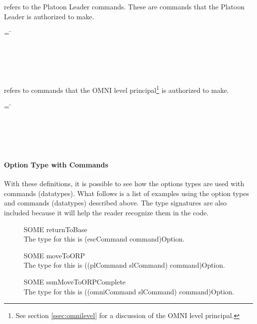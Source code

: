 \documentclass[../../main/main.tex]{subfiles}
\begin{document}
 refers to the Platoon Leader commands.  These are commands that the Platoon Leader is authorized to make.  

\begin{tabbing}
 = \=  \\
					     \>\HOLTokenBar{}  \\
					     \>\HOLTokenBar{}  \\
					     \>\HOLTokenBar{} \\
         				     \> \HOLTokenBar{}  \\
				             \> \HOLTokenBar{} 
\end{tabbing}


 refers to commands that the OMNI level principal\footnote{See section \ref{ssec:omnilevel} for a discussion of the OMNI level principal.} is authorized to make. 

\begin{tabbing}
 = \=  \\
						 \> \HOLTokenBar{} \\
 				       	 	 \> \HOLTokenBar{}  \\
						 \> \HOLTokenBar{} \\
            					 \> \HOLTokenBar{} \\
					 	 \> \HOLTokenBar{} 
\end{tabbing}          
          
          
\paragraph*{Option Type with Commands}
With these definitions, it is possible to see how the options types are used with commands (datatypes).  What follows is a list of examples using the option types and commands (datatypes) described above.  The type signatures are also included because it will help the reader recognize them in the  code.
\begin{description}
\item[ ] SOME returnToBase \\
The type for this is (escCommand command)Option.
\item[ ] SOME moveToORP  \\
The type for this is ((plCommand slCommand) command)Option.  
\item[ ] SOME ssmMoveToORPComplete\\
The type for this is ((omniCommand slCommand) command)Option.  
\end{description}
\end{document}
